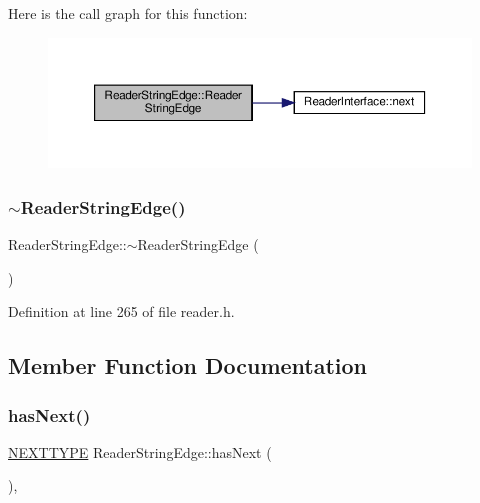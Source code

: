 Here is the call graph for this function\+:
\nopagebreak
\begin{figure}[H]
\begin{center}
\leavevmode
\includegraphics[width=350pt]{classReaderStringEdge_acfd14224a4533371c4c2314d1434e65c_cgraph}
\end{center}
\end{figure}
\mbox{\label{classReaderStringEdge_a076dd2db15a1260c0bdf4d33e2144989}} 
\subsubsection{\texorpdfstring{$\sim$\+Reader\+String\+Edge()}{~ReaderStringEdge()}}
{\footnotesize\ttfamily Reader\+String\+Edge\+::$\sim$\+Reader\+String\+Edge (\begin{DoxyParamCaption}{ }\end{DoxyParamCaption})\hspace{0.3cm}{\ttfamily [inline]}}



Definition at line 265 of file reader.\+h.



\subsection{Member Function Documentation}
\mbox{\label{classReaderStringEdge_a7c43108413f8f867d5ee2cb35d777cd3}} 
\subsubsection{\texorpdfstring{has\+Next()}{hasNext()}}
{\footnotesize\ttfamily \hyperlink{classReaderInterface_ac2420ec8d2f60feadf2533d4fa77ec5e}{N\+E\+X\+T\+T\+Y\+PE} Reader\+String\+Edge\+::has\+Next (\begin{DoxyParamCaption}{ }\end{DoxyParamCaption})\hspace{0.3cm}{\ttfamily [inline]}, {\ttfamily [virtual]}}

